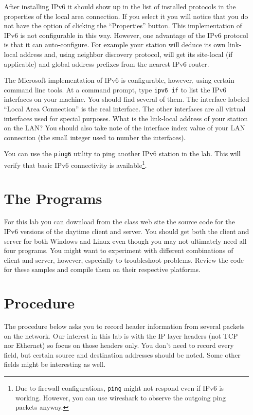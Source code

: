\documentclass[twocolumn]{article}
\begin{document}
After installing IPv6 it should show up in the list of installed protocols in the properties of
the local area connection. If you select it you will notice that you do not have the option of
clicking the ``Properties'' button. This implementation of IPv6 is not configurable in this way.
However, one advantage of the IPv6 protocol is that it can auto-configure. For example your
station will deduce its own link-local address and, using neighbor discovery protocol, will get
its site-local (if applicable) and global address prefixes from the nearest IPv6 router.

The Microsoft implementation of IPv6 is configurable, however, using certain command line tools.
At a command prompt, type \texttt{ipv6 if} to list the IPv6 interfaces on your machine. You
should find several of them. The interface labeled ``Local Area Connection'' is the real
interface. The other interfaces are all virtual interfaces used for special purposes. What is
the link-local address of your station on the LAN? You should also take note of the interface
index value of your LAN connection (the small integer used to number the interfaces).

You can use the \texttt{ping6} utility to ping another IPv6 station in the lab. This will verify
that basic IPv6 connectivity is available\footnote{Due to firewall configurations, \texttt{ping}
  might not respond even if IPv6 is working. However, you can use wireshark to observe the
  outgoing ping packets anyway.}.

\section{The Programs}

For this lab you can download from the class web site the source code for the IPv6 versions of
the daytime client and server. You should get both the client and server for both Windows and
Linux even though you may not ultimately need all four programs. You might want to experiment
with different combinations of client and server, however, especially to troubleshoot problems.
Review the code for these samples and compile them on their respective platforms.

\section{Procedure}

The procedure below asks you to record header information from several packets on the network.
Our interest in this lab is with the IP layer headers (not TCP nor Ethernet) so focus on those
headers only. You don't need to record every field, but certain source and destination addresses
should be noted. Some other fields might be interesting as well.
\end{document}

